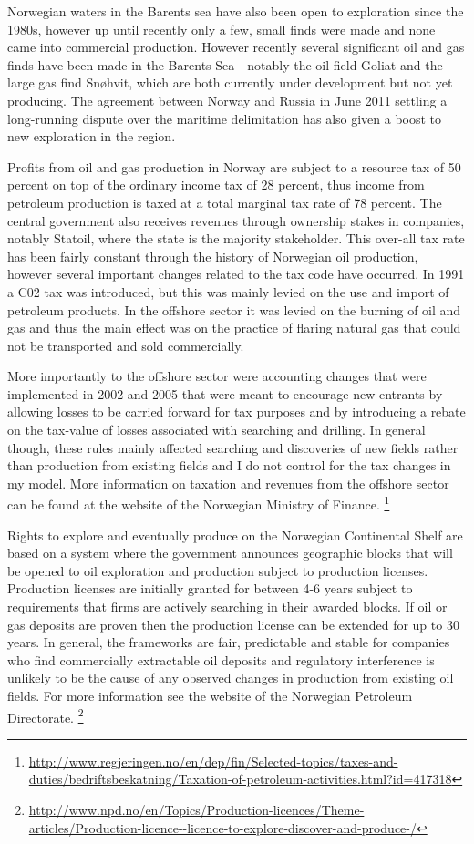 \documentclass[12pt]{scrartcl} %
\begin{document}
Norwegian waters in the Barents sea have also been open to exploration since the 1980s, however up until recently only a few, small finds were made and none came into commercial production.  However recently several significant oil and gas finds have been made in the Barents Sea - notably the oil field Goliat and the large gas find Sn\o hvit, which are both currently under development but not yet producing.  The agreement between Norway and Russia in June 2011 settling a long-running dispute over the maritime delimitation has also given a boost to new exploration in the region.  

Profits from oil and gas production in Norway are subject to a resource tax of 50 percent on top of the ordinary income tax of 28 percent, thus income from petroleum production is taxed at a total marginal tax rate of 78 percent.  The central government also receives revenues through ownership stakes in companies, notably Statoil, where the state is the majority stakeholder.  This over-all tax rate has been fairly constant through the history of Norwegian oil production, however several important changes related to the tax code have occurred.  In 1991 a C02 tax was introduced, but this was mainly levied on the use and import of petroleum products.  In the offshore sector it was levied on the burning of oil and gas and thus the main effect was on the practice of flaring natural gas that could not be transported and sold commercially.   

More importantly to the offshore sector were accounting changes that were implemented in 2002 and 2005 that were meant to encourage new entrants by allowing losses to be carried forward for tax purposes and by introducing a rebate on the tax-value of losses associated with searching and drilling.  In general though, these rules mainly affected searching and discoveries of new fields rather than production from existing fields and I do not control for the tax changes in my model.  More information on taxation and revenues from the offshore sector can be found at the website of the Norwegian Ministry of Finance. \footnote{\url{http://www.regjeringen.no/en/dep/fin/Selected-topics/taxes-and-duties/bedriftsbeskatning/Taxation-of-petroleum-activities.html?id=417318}}

Rights to explore and eventually produce on the Norwegian Continental Shelf are based on a system where the government announces geographic blocks that will be opened to oil exploration and production subject to production licenses.  Production licenses are initially granted for between 4-6 years subject to requirements that firms are actively searching in their awarded blocks.  If oil or gas deposits are proven then the production license can be extended for up to 30 years.  In general, the frameworks are fair, predictable and stable for companies who find commercially extractable oil deposits and regulatory interference is unlikely to be the cause of any observed changes in production from existing oil fields.  For more information see the website of the Norwegian Petroleum Directorate. \footnote{\url{http://www.npd.no/en/Topics/Production-licences/Theme-articles/Production-licence--licence-to-explore-discover-and-produce-/}}
\end{document}
